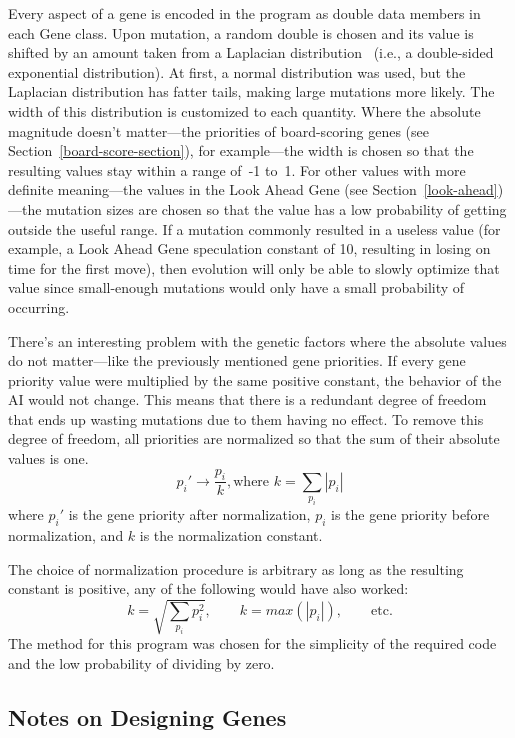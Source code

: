 \documentclass[letterpaper]{article}
\newcommand{\code}[1]{\small\textsf{#1}}
\renewcommand{\_}{\allowbreak\textunderscore\allowbreak}
\begin{document}
Every aspect of a gene is encoded in the program as \code{double} data members in each Gene class. Upon mutation, a random \code{double} is chosen and its value is shifted by an amount taken from a Laplacian distribution~\cite{laplace} (i.e., a double-sided exponential distribution). At first, a normal distribution was used, but the Laplacian distribution has fatter tails, making large mutations more likely. The width of this distribution is customized to each quantity. Where the absolute magnitude doesn't matter---the priorities of board-scoring genes (see Section~\ref{board-score-section}), for example---the width is chosen so that the resulting values stay within a range of~-1 to~1. For other values with more definite meaning---the values in the Look Ahead Gene (see Section~\ref{look-ahead})---the mutation sizes are chosen so that the value has a low probability of getting outside the useful range. If a mutation commonly resulted in a useless value (for example, a Look Ahead Gene speculation constant of 10, resulting in losing on time for the first move), then evolution will only be able to slowly optimize that value since small-enough mutations would only have a small probability of occurring.

There's an interesting problem with the genetic factors where the absolute values do not matter---like the previously mentioned gene priorities. If every gene priority value were multiplied by the same positive constant, the behavior of the AI would not change. This means that there is a redundant degree of freedom that ends up wasting mutations due to them having no effect. To remove this degree of freedom, all priorities are normalized so that the sum of their absolute values is one.
\[p_i' \to \frac{p_i}{k}, \textrm{where } k = \sum_{p_i} |p_i|\]
where \(p_i'\) is the gene priority after normalization, \(p_i\) is the gene priority before normalization, and \(k\) is the normalization constant.

The choice of normalization procedure is arbitrary as long as the resulting constant is positive, any of the following would have also worked:
\[k = \sqrt{\sum_{p_i}p_i^2}, \qquad k = max(|p_i|), \qquad \textrm{etc.}\]
The method for this program was chosen for the simplicity of the required code and the low probability of dividing by zero.

\subsection{Notes on Designing Genes}
\end{document}
